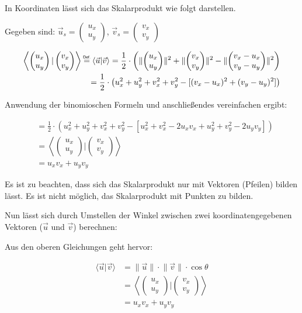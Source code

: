 \documentclass{article}
\newcommand{\m}[1]{\begin{pmatrix}#1\end{pmatrix}}
\newcommand{\myeq}[1]{\mathrel{\overset{\makebox[0pt]{\mbox{\normalfont\tiny\sffamily #1}}}{=}}}
\begin{document}
    In Koordinaten lässt sich das Skalarprodukt wie folgt darstellen.

    Gegeben sind:
    ${\vec{u}}_{s} = \m{u_x \\ u_y}$, ${\vec{v}}_{s} = \m{v_x \\ v_y}$

    \[
        \begin{split}
            \left \langle \m{u_x \\ u_y} \vert \m{v_x \\ v_y} \right \rangle \myeq{Def.} \left \langle \vec{u} \vert \vec{v} \right \rangle = \frac{1}{2} \cdot \left ( \lVert \m{u_x \\ u_y} \rVert ^2 + \lVert \m{v_x \\ v_y} \rVert ^2 - \lVert \m{v_x - u_x \\ v_y - u_y} \rVert ^2 \right ) \\
            = \frac{1}{2} \cdot \left ( u_x^2 + u_y^2 + v_x^2 + v_y^2 - [(v_x - u_x)^2 + (v_y - u_y)^2] \right ) \\
        \end{split}
    \]

    Anwendung der binomioschen Formeln und anschließendes vereinfachen ergibt:

    \[
      \begin{split}
        &= \frac{1}{2} \cdot \left ( u_x^2 + u_y^2 + v_x^2 + v_y^2 - [u_x^2 + v_x^2 - 2u_x v_x + u_y^2 + v_y^2 - 2u_y v_y] \right ) \\
        &= \left \langle \m{u_x \\ u_y} \vert \m{v_x \\ v_y} \right \rangle \\
        &= u_x v_x + u_y v_y
      \end{split}  
    \]

    Es ist zu beachten, dass sich das Skalarprodukt nur mit Vektoren (Pfeilen) bilden lässt.
    Es ist nicht möglich, das Skalarprodukt mit Punkten zu bilden.


    Nun lässt sich durch Umstellen der Winkel zwischen zwei koordinatengegebenen
    Vektoren ($\vec{u}$ und $\vec{v}$) berechnen:

    Aus den oberen Gleichungen geht hervor:

    \[
      \begin{split}
        \langle \vec{u} \vert \vec{v} \rangle &= \lVert \vec{u} \rVert \cdot \lVert \vec{v} \rVert \cdot \cos \theta \\
        &= \left \langle \m{u_x \\ u_y} \vert \m{v_x \\ v_y} \right \rangle \\
        &= u_x v_x + u_y v_y \\
      \end{split}  
    \]
\end{document}
